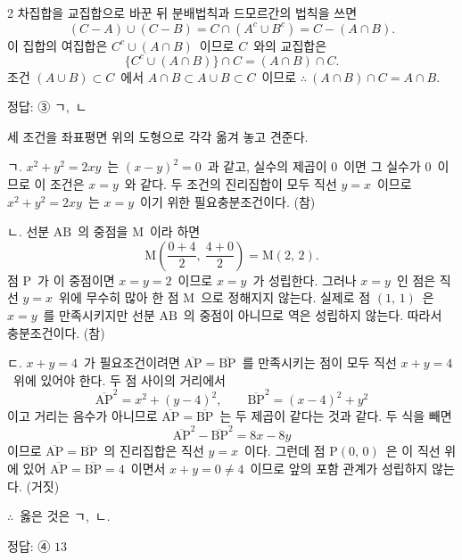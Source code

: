 \documentclass[10pt,fleqn]{article}
\begin{document}
\begin{multicols*}{2}
차집합을 교집합으로 바꾼 뒤 분배법칙과 드모르간의 법칙을 쓰면
$$(C-A)\cup(C-B)=C\cap(A^{c}\cup B^{c})=C-(A\cap B).$$
이 집합의 여집합은 $C^{c}\cup(A\cap B)$\ 이므로 $C$\ 와의 교집합은
$$\{C^{c}\cup(A\cap B)\}\cap C=(A\cap B)\cap C.$$
조건 $(A\cup B)\subset C$\ 에서 $A\cap B\subset A\cup B\subset C$\ 이므로 $\therefore\ (A\cap B)\cap C=A\cap B$.

\begin{dmanswerbox}
정답: ③ ㄱ,\ ㄴ
\end{dmanswerbox}

세 조건을 좌표평면 위의 도형으로 각각 옮겨 놓고 견준다.

ㄱ. $x^{2}+y^{2}=2xy$\ 는 $(x-y)^{2}=0$\ 과 같고, 실수의 제곱이 $0$\ 이면 그 실수가 $0$\ 이므로 이 조건은 $x=y$\ 와 같다. 두 조건의 진리집합이 모두 직선 $y=x$\ 이므로 $x^{2}+y^{2}=2xy$\ 는 $x=y$\ 이기 위한 필요충분조건이다. (참)

ㄴ. 선분 $\mathrm{AB}$\ 의 중점을 $\mathrm{M}$\ 이라 하면
$$\mathrm{M}\!\left(\dfrac{0+4}{2},\ \dfrac{4+0}{2}\right)=\mathrm{M}(2,\,2).$$
점 $\mathrm{P}$\ 가 이 중점이면 $x=y=2$\ 이므로 $x=y$\ 가 성립한다. 그러나 $x=y$\ 인 점은 직선 $y=x$\ 위에 무수히 많아 한 점 $\mathrm{M}$\ 으로 정해지지 않는다. 실제로 점 $(1,\,1)$\ 은 $x=y$\ 를 만족시키지만 선분 $\mathrm{AB}$\ 의 중점이 아니므로 역은 성립하지 않는다. 따라서 충분조건이다. (참)

ㄷ. $x+y=4$\ 가 필요조건이려면 $\overline{\mathrm{AP}}=\overline{\mathrm{BP}}$\ 를 만족시키는 점이 모두 직선 $x+y=4$\ 위에 있어야 한다. 두 점 사이의 거리에서
$$\overline{\mathrm{AP}}^{2}=x^{2}+(y-4)^{2},\qquad \overline{\mathrm{BP}}^{2}=(x-4)^{2}+y^{2}$$
이고 거리는 음수가 아니므로 $\overline{\mathrm{AP}}=\overline{\mathrm{BP}}$\ 는 두 제곱이 같다는 것과 같다. 두 식을 빼면
$$\overline{\mathrm{AP}}^{2}-\overline{\mathrm{BP}}^{2}=8x-8y$$
이므로 $\overline{\mathrm{AP}}=\overline{\mathrm{BP}}$\ 의 진리집합은 직선 $y=x$\ 이다. 그런데 점 $\mathrm{P}(0,\,0)$\ 은 이 직선 위에 있어 $\overline{\mathrm{AP}}=\overline{\mathrm{BP}}=4$\ 이면서 $x+y=0\ne 4$\ 이므로 앞의 포함 관계가 성립하지 않는다. (거짓)

$\therefore$\ 옳은 것은 ㄱ,\ ㄴ.

\begin{dmanswerbox}
정답: ④ $13$
\end{dmanswerbox}


\end{multicols*}
\end{document}
